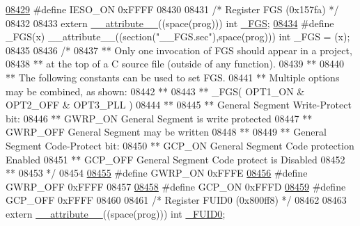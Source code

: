 \begin{DoxyCode}
{{{{\hypertarget{a00009_source_l08429}{}\hyperlink{a00009_ae5e524ce10c0264959925ccb98246055}{08429} \textcolor{preprocessor}{#define IESO\_ON              0xFFFF}
08430 
08431 \textcolor{comment}{/* Register FGS (0x157fa)                               */}
08432 
08433 \textcolor{keyword}{extern} \hyperlink{a00009_a493c46f03454991ccc5aa7a6e1dfb2a7}{\_\_attribute\_\_}((space(prog))) int \hyperlink{a00009_a39509b8a40f172708ac67db59ccf53da}{\_FGS};
\hypertarget{a00009_source_l08434}{}\hyperlink{a00009_a39509b8a40f172708ac67db59ccf53da}{08434} \textcolor{preprocessor}{#define \_FGS(x) \_\_attribute\_\_((section("\_\_FGS.sec"),space(prog))) int \_FGS = (x);}
08435 
08436 \textcolor{comment}{/*}
08437 \textcolor{comment}{** Only one invocation of FGS should appear in a project,}
08438 \textcolor{comment}{** at the top of a C source file (outside of any function).}
08439 \textcolor{comment}{**}
08440 \textcolor{comment}{** The following constants can be used to set FGS.}
08441 \textcolor{comment}{** Multiple options may be combined, as shown:}
08442 \textcolor{comment}{**}
08443 \textcolor{comment}{** \_FGS( OPT1\_ON & OPT2\_OFF & OPT3\_PLL )}
08444 \textcolor{comment}{**}
08445 \textcolor{comment}{**   General Segment Write-Protect bit:}
08446 \textcolor{comment}{**     GWRP\_ON              General Segment is write protected}
08447 \textcolor{comment}{**     GWRP\_OFF             General Segment may be written}
08448 \textcolor{comment}{**}
08449 \textcolor{comment}{**   General Segment Code-Protect bit:}
08450 \textcolor{comment}{**     GCP\_ON               General Segment Code protection Enabled}
08451 \textcolor{comment}{**     GCP\_OFF              General Segment Code protect is Disabled}
08452 \textcolor{comment}{**}
08453 \textcolor{comment}{*/}
08454 
\hypertarget{a00009_source_l08455}{}\hyperlink{a00009_a706a042b10cc342b4f782a8ddbba47a6}{08455} \textcolor{preprocessor}{#define GWRP\_ON              0xFFFE}
\hypertarget{a00009_source_l08456}{}\hyperlink{a00009_a499b7d150bcb8c5ea33ac73d01c4703c}{08456} \textcolor{preprocessor}{#define GWRP\_OFF             0xFFFF}
08457 
\hypertarget{a00009_source_l08458}{}\hyperlink{a00009_a87b73e82443697f5b246a5ac25eccb62}{08458} \textcolor{preprocessor}{#define GCP\_ON               0xFFFD}
\hypertarget{a00009_source_l08459}{}\hyperlink{a00009_a21ec329a371420b9f71f1c011d0e061f}{08459} \textcolor{preprocessor}{#define GCP\_OFF              0xFFFF}
08460 
08461 \textcolor{comment}{/* Register FUID0 (0x800ff8)                               */}
08462 
08463 \textcolor{keyword}{extern} \hyperlink{a00009_a493c46f03454991ccc5aa7a6e1dfb2a7}{\_\_attribute\_\_}((space(prog))) int \hyperlink{a00009_a8f1f7e736797ec125ac83da190ad1875}{\_FUID0};
}}}}
\end{DoxyCode}
